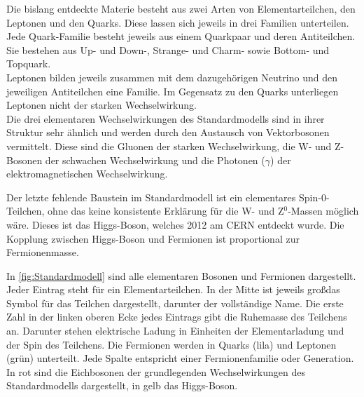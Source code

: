 
Die bislang entdeckte Materie besteht aus zwei Arten von Elementarteilchen, den Leptonen und den Quarks. Diese lassen sich jeweils in drei Familien unterteilen. Jede Quark-Familie besteht jeweils aus einem Quarkpaar und deren Antiteilchen. Sie bestehen aus Up- und Down-, Strange- und Charm- sowie Bottom- und Topquark.\\
Leptonen bilden jeweils zusammen mit dem dazugeh\"origen Neutrino und den jeweiligen Antiteilchen eine Familie. Im Gegensatz zu den Quarks unterliegen Leptonen nicht der starken Wechselwirkung.\\
Die drei elementaren Wechselwirkungen des Standardmodells sind in ihrer Struktur sehr \"ahnlich und werden durch den Austausch von Vektorbosonen vermittelt. Diese sind die Gluonen der starken Wechselwirkung, die W- und Z-Bosonen der schwachen Wechselwirkung und die Photonen ($\gamma$) der elektromagnetischen Wechselwirkung.%

Der letzte fehlende Baustein im Standardmodell ist ein elementares Spin-0-Teilchen, ohne das keine konsistente Erkl\"arung f\"ur die W- und Z$^0$-Massen m\"oglich w\"are. Dieses ist das Higgs-Boson, welches 2012 am CERN entdeckt wurde. Die Kopplung zwischen Higgs-Boson und Fermionen ist proportional zur Fermionenmasse.

In \ref{fig:Standardmodell} sind alle elementaren Bosonen und Fermionen dargestellt. Jeder Eintrag steht f\"ur ein Elementarteilchen. In der Mitte ist jeweils gro\ss  das Symbol f\"ur das Teilchen dargestellt, darunter der vollst\"andige Name. Die erste Zahl in der linken oberen Ecke jedes Eintrags gibt die Ruhemasse des Teilchens an. Darunter stehen elektrische Ladung in Einheiten der Elementarladung und der Spin des Teilchens. Die Fermionen werden in Quarks (lila) und Leptonen (gr\"un) unterteilt. Jede Spalte entspricht einer Fermionenfamilie oder Generation. In rot sind die Eichbosonen der grundlegenden Wechselwirkungen des Standardmodells dargestellt, in gelb das Higgs-Boson.

